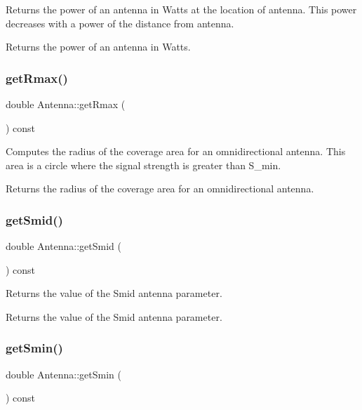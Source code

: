 Returns the power of an antenna in Watts at the location of antenna. This power decreases with a power of the distance from antenna. \begin{DoxyReturn}{Returns}
the power of an antenna in Watts. 
\end{DoxyReturn}
\mbox{\label{class_antenna_adf33d1b0be85f95c543a31dc1b3159f5}} 
\subsubsection{\texorpdfstring{get\+Rmax()}{getRmax()}}
{\footnotesize\ttfamily double Antenna\+::get\+Rmax (\begin{DoxyParamCaption}{ }\end{DoxyParamCaption}) const}

Computes the radius of the coverage area for an omnidirectional antenna. This area is a circle where the signal strength is greater than S\+\_\+min. \begin{DoxyReturn}{Returns}
the radius of the coverage area for an omnidirectional antenna. 
\end{DoxyReturn}
\mbox{\label{class_antenna_acfaf47d35cc742e76522ea31a8b01578}} 
\subsubsection{\texorpdfstring{get\+Smid()}{getSmid()}}
{\footnotesize\ttfamily double Antenna\+::get\+Smid (\begin{DoxyParamCaption}{ }\end{DoxyParamCaption}) const}

Returns the value of the Smid antenna parameter. \begin{DoxyReturn}{Returns}
the value of the Smid antenna parameter. 
\end{DoxyReturn}
\mbox{\label{class_antenna_a1955f59f9d3b20ffd8e79f4893bf2e61}} 
\subsubsection{\texorpdfstring{get\+Smin()}{getSmin()}}
{\footnotesize\ttfamily double Antenna\+::get\+Smin (\begin{DoxyParamCaption}{ }\end{DoxyParamCaption}) const}

